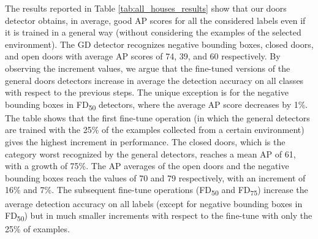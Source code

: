 The results reported in Table \ref{tab:all_houses_results} show that our doors detector obtains, in average, good AP scores for all the considered labels even if it is trained in a general way (without considering the examples of the selected environment). The \textsf{GD} detector recognizes negative bounding boxes, closed doors, and open doors with average AP scores of 74, 39, and 60 respectively. By observing the increment values, we argue that the fine-tuned versions of the general doors detectors increase in average the detection accuracy on all classes with respect to the previous steps. The unique exception is for the negative bounding boxes in \textsf{FD\textsubscript{50}} detectors, where the average AP score decreases by 1\%.  The table shows that the first fine-tune operation (in which the general detectors are trained with the 25\% of the examples collected from a certain environment) gives the highest increment in performance. The closed doors, which is the category worst recognized by the general detectors, reaches a mean AP of 61, with a growth of 75\%. The AP averages of the open doors and the negative bounding boxes reach the values of 70 and 79 respectively, with an increment of 16\% and 7\%. The subsequent fine-tune operations (\textsf{FD\textsubscript{50}} and \textsf{FD\textsubscript{75}}) increase the average detection accuracy on all labels (except for negative bounding boxes in \textsf{FD\textsubscript{50}}) but in much smaller increments with respect to the fine-tune with only the 25\% of examples. 


